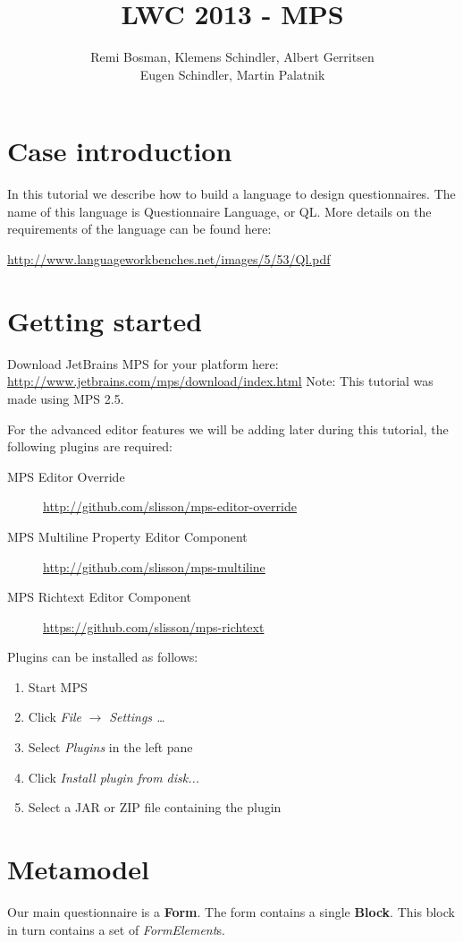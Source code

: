 \documentclass[11pt]{article}
\begin{document}
\title{LWC 2013 - MPS}
\author{Remi Bosman, Klemens Schindler, Albert Gerritsen\\
Eugen Schindler, Martin Palatnik}

\maketitle

\section{Case introduction}
In this tutorial we describe how to build a language to design questionnaires.
The name of this language is Questionnaire Language, or QL.
More details on the requirements of the language can be found here:

\url{http://www.languageworkbenches.net/images/5/53/Ql.pdf}

\section{Getting started}
Download JetBrains MPS for your platform here:
\url{http://www.jetbrains.com/mps/download/index.html}
Note: This tutorial was made using MPS 2.5.

For the advanced editor features we will be adding later during this tutorial, the following plugins are required:
\begin{description}
\item[MPS Editor Override] \url{http://github.com/slisson/mps-editor-override}
\item[MPS Multiline Property Editor Component] \url{http://github.com/slisson/mps-multiline}
\item[MPS Richtext Editor Component] \url{https://github.com/slisson/mps-richtext}
\end{description}

Plugins can be installed as follows:
\begin{enumerate}
\item Start MPS
\item Click \textit{File} $\rightarrow$ \textit{Settings \ldots}
\item Select \textit{Plugins} in the left pane
\item Click \textit{Install plugin from disk...}
\item Select a JAR or ZIP file containing the plugin
\end{enumerate}

\section{Metamodel}
Our main questionnaire is a \textbf{Form}. The form contains a single \textbf{Block}. This block in turn contains a set of \textit{FormElement}s. 
\end{document}
